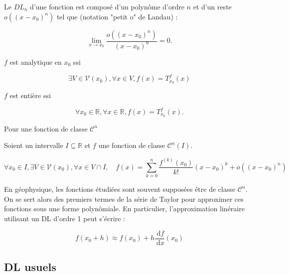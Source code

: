 Le $D L_n$ d'une fonction est composé d'un polynôme d'ordre $n$ et d'un reste $o\left(\left(x-x_0\right)^n\right)$ tel que (notation "petit o" de Landau) :

$$
\lim _{x \rightarrow x_0} \frac{o\left(\left(x-x_0\right)^n\right)}{\left(x-x_0\right)^n}=0 .
$$



$f$ est analytique en $x_0$ ssi

$$
\exists V \in \mathcal{V}\left(x_0\right), \forall x \in V, f(x)=T_{x_0}^f(x)
$$

$f$ est entière ssi

$$
\forall x_0 \in \mathbb{R}, \forall x \in \mathbb{R}, f(x)=T_{x_0}^f(x) .
$$

Pour une fonction de classe $\mathcal{C}^n$

Soient un intervalle $I \subseteq \mathbb{R}$ et $f$ une fonction de classe $\mathcal{C}^n(I)$.

$$
\forall x_0 \in I, \exists V \in \mathcal{V}\left(x_0\right), \forall x \in V \cap I, \quad f(x)=\sum_{k=0}^n \frac{f^{(k)}\left(x_0\right)}{k!}\left(x-x_0\right)^k+o\left(\left(x-x_0\right)^n\right)
$$


En géophysique, les fonctions étudiées sont souvent supposées être de classe $\mathcal{C}^n$. On se sert alors des premiers termes de la série de Taylor pour approximer ces fonctions sous une forme polynômiale. En particulier, l'approximation linéraire utilisant un DL d'ordre 1 peut s'écrire :

$$
f\left(x_0+h\right) \approx f\left(x_0\right)+h \frac{\mathrm{~d} f}{\mathrm{~d} x}\left(x_0\right)
$$

\subsection{DL usuels}